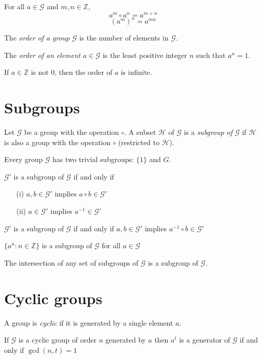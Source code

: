 \theorem 
For all $a \in \mathcal{G}$ and $m, n \in \mathbb{Z}$, 
\[a^m \circ a^n = a^{m+n}\]
\[(a^m)^n = a^{mn}\]

 The \textit{order of a group} $\mathcal{G}$ is the number of elements in $\mathcal{G}$.

 The \textit{order of an element} $a \in \mathcal{G}$ is the least positive integer $n$ such that $a^n = 1$.

 If $a \in \mathbb{Z}$ is not $0$, then the order of $a$ is infinite.


\section{Subgroups}

Let $\mathcal{G}$ be a group with the operation $\circ$. A subset $\mathcal{H}$ of $\mathcal{G}$ is a \textit{subgroup of} $\mathcal{G}$ if $\mathcal{H}$ is also a group with the operation $\circ$ (restricted to $\mathcal{H}$).

Every group $\mathcal{G}$ has two trivial subgroups: $\{1\}$ and $G$.

\theorem 
$\mathcal{G}'$ is a subgroup of $\mathcal{G}$ if and only if
\begin{itemize}
    \item[(i)] 
        $a, b \in \mathcal{G}'$ implies $a \circ b \in \mathcal{G}'$
    \item[(ii)]
        $a \in \mathcal{G}'$ implies $a^{-1} \in \mathcal{G}'$
\end{itemize}

\theorem
$\mathcal{G}'$ is a subgroup of $\mathcal{G}$ if and only if $a, b \in \mathcal{G}'$ implies $a^{-1} \circ b \in \mathcal{G}'$

\theorem
$\{a^n : n \in \mathbb{Z}\}$ is a subgroup of $\mathcal{G}$ for all $a \in \mathcal{G}$

\theorem
The intersection of any set of subgroups of $\mathcal{G}$ is a subgroup of $\mathcal{G}$.


\section{Cyclic groups}

A group is \textit{cyclic} if it is generated by a single element $a$.

\theorem
If $\mathcal{G}$ is a cyclic group of order $n$ generated by $a$ then $a^t$ is a generator of $\mathcal{G}$ if and only if $\gcd(n, t) = 1$

